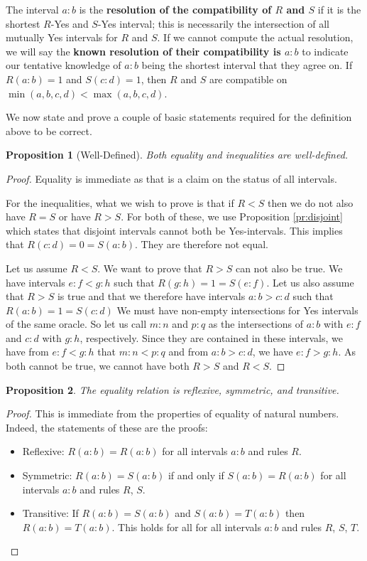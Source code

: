 \documentclass[12pt]{article}
\newtheorem{proposition}{Proposition}
\theoremstyle{remark}
\begin{document}
The interval $a:b$ is the \textbf{resolution of the compatibility of $R$ and $S$} if it is the shortest $R$-Yes and $S$-Yes interval; this is necessarily the intersection of all mutually Yes intervals for $R$ and $S$. If we cannot compute the actual resolution, we will say the \textbf{known resolution of their compatibility is $a:b$} to indicate our tentative knowledge of $a:b$ being the shortest interval that they agree on. If $R(a:b) = 1$ and $S(c:d) = 1$, then $R$ and $S$ are compatible on $\min(a,b,c,d)<\max(a,b,c,d)$. 

We now state and prove a couple of basic statements required for the definition above to be correct. 

\begin{proposition}[Well-Defined]\label{pr:wd}
Both equality and inequalities are well-defined. 
\end{proposition}

\begin{proof}
Equality is immediate as that is a claim on the status of all intervals. 

For the inequalities, what we wish to prove is that if $R < S$ then we do not also have $R=S$ or have $R > S$. For both of these, we use Proposition \ref{pr:disjoint} which states that disjoint intervals cannot both be Yes-intervals. This implies that $R(c:d) = 0 = S(a:b)$. They are therefore not equal. 

Let us assume $R < S$. We want to prove that $R>S$ can not also be true. We have intervals $e:f < g:h$ such that $R(g:h) = 1 = S(e:f)$. Let us also assume that $R>S$ is true and that we therefore have intervals $a:b > c:d$ such that $R(a:b) = 1 = S(c:d)$ We must have non-empty intersections for Yes intervals of the same oracle. So let us call $m:n$ and $p:q$ as the intersections of $a:b$ with $e:f$ and $c:d$ with $g:h$, respectively. Since they are contained in these intervals, we have from $e:f < g:h$ that $m:n < p:q$ and from $a:b > c:d$, we have $e:f > g:h$. As both cannot be true, we cannot have both $R>S$ and $R<S$. 
\end{proof}

\begin{proposition}\label{pr:reflexive}
The equality relation is reflexive, symmetric, and transitive. 
\end{proposition}

\begin{proof}
This is immediate from the properties of equality of natural numbers. Indeed, the statements of these are the proofs:
\begin{itemize}
    \item Reflexive: $R(a:b)=R(a:b)$ for all intervals $a:b$ and rules $R$.
    \item Symmetric: $R(a:b)=S(a:b)$ if and only if $S(a:b) = R(a:b)$ for all intervals $a:b$ and rules $R$, $S$.
    \item Transitive: If $R(a:b)=S(a:b)$ and $S(a:b) = T(a:b)$ then $R(a:b)=T(a:b)$. This holds for all for all intervals $a:b$ and rules $R$, $S$, $T$.
\end{itemize}
\end{proof}
\end{document}
